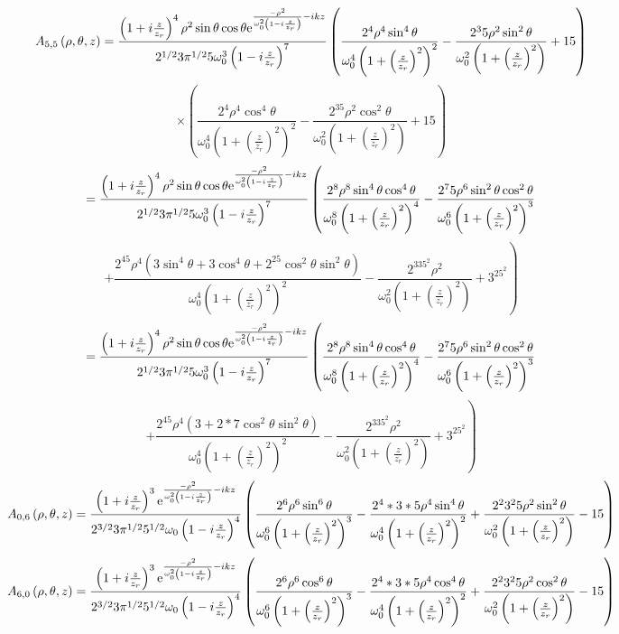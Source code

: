 \documentclass[11pt]{amsart}
\makeatletter
\newcommand{\e}{{\rm e}}				%
\newcommand{\0}{\varnothing}		%
\newcommand{\1}{!}
\newcommand{\2}{@}
\newcommand{\3}{\#}
\newcommand{\4}{\$}
\newcommand{\5}{\%}
\newcommand{\6}{$^\wedge$}
\newcommand{\7}{\&}
\newcommand{\8}{*}
\newcommand{\9}{(}
\makeatother
\begin{document}
\[
A_{5,5} \left(\rho, \theta,z \right) = \frac{\left(1+i\frac{z}{z_r}\right)^4\rho^2\sin \theta \cos \theta\e^{\frac{-\rho^2}{\omega_0^2\left(1-i\frac{z}{z_r}\right)}-ikz}}{2^{1/2}3\pi^{1/2}5\omega_0^3\left(1-i\frac{z}{z_r}\right)^7}\left(\frac{2^4\rho^4\sin^4 \theta}{\omega_0^4\left(1+\left(\frac{z}{z_r}\right)^2\right)^2}-\frac{2^35\rho^2\sin^2\theta}{\omega_0^2\left(1+\left(\frac{z}{z_r}\right)^2\right)}+15\right)
\]
\[
\times \left(\frac{2^4\rho^4\cos^4 \theta}{\omega_0^4\left(1+\left(\frac{z}{z_r}\right)^2\right)^2}-\frac{2^35\rho^2\cos^2\theta}{\omega_0^2\left(1+\left(\frac{z}{z_r}\right)^2\right)}+15\right)
\]
\[
= \frac{\left(1+i\frac{z}{z_r}\right)^4\rho^2\sin \theta \cos \theta\e^{\frac{-\rho^2}{\omega_0^2\left(1-i\frac{z}{z_r}\right)}-ikz}}{2^{1/2}3\pi^{1/2}5\omega_0^3\left(1-i\frac{z}{z_r}\right)^7}\left(\frac{2^8\rho^8\sin^4\theta \cos^4\theta}{\omega_0^8\left(1+\left(\frac{z}{z_r}\right)^2\right)^4}-\frac{2^75\rho^6\sin^2\theta\cos^2\theta}{\omega_0^6\left(1+\left(\frac{z}{z_r}\right)^2\right)^3}\right.
\]
\[
\left.+\frac{2^45\rho^4\left(3\sin^4\theta+3\cos^4\theta +2^25\cos^2\theta\sin^2\theta\right)}{\omega_0^4\left(1+\left(\frac{z}{z_r}\right)^2\right)^2}-\frac{2^335^2\rho^2}{\omega_0^2\left(1+\left(\frac{z}{z_r}\right)^2\right)} + 3^25^2\right)
\]
\[
= \frac{\left(1+i\frac{z}{z_r}\right)^4\rho^2\sin \theta \cos \theta\e^{\frac{-\rho^2}{\omega_0^2\left(1-i\frac{z}{z_r}\right)}-ikz}}{2^{1/2}3\pi^{1/2}5\omega_0^3\left(1-i\frac{z}{z_r}\right)^7}\left(\frac{2^8\rho^8\sin^4\theta \cos^4\theta}{\omega_0^8\left(1+\left(\frac{z}{z_r}\right)^2\right)^4}-\frac{2^75\rho^6\sin^2\theta\cos^2\theta}{\omega_0^6\left(1+\left(\frac{z}{z_r}\right)^2\right)^3}\right.
\]
\[
\left.+\frac{2^45\rho^4\left(3 +2*7\cos^2\theta\sin^2\theta\right)}{\omega_0^4\left(1+\left(\frac{z}{z_r}\right)^2\right)^2}-\frac{2^335^2\rho^2}{\omega_0^2\left(1+\left(\frac{z}{z_r}\right)^2\right)} + 3^25^2\right)
\]
\[
A_{0,6}\left(\rho,\theta,z\right) = \frac{\left(1+i\frac{z}{z_r}\right)^3\e^{\frac{-\rho^2}{\omega_0^2\left(1-i\frac{z}{z_r}\right)}-ikz}}{2^{3/2}3\pi^{1/2}5^{1/2}\omega_0\left(1-i\frac{z}{z_r}\right)^4}\left(\frac{2^6\rho^6\sin^6\theta}{\omega_0^6\left(1+\left(\frac{z}{z_r}\right)^2\right)^3}-\frac{2^4*3*5\rho^4 \sin^4\theta}{\omega_0^4\left(1+\left(\frac{z}{z_r}\right)^2\right)^2}+\frac{2^23^25\rho^2\sin^2\theta}{\omega_0^2\left(1+\left(\frac{z}{z_r}\right)^2\right)}-15\right)
\]
\[
A_{6,0}\left(\rho,\theta,z\right) = \frac{\left(1+i\frac{z}{z_r}\right)^3\e^{\frac{-\rho^2}{\omega_0^2\left(1-i\frac{z}{z_r}\right)}-ikz}}{2^{3/2}3\pi^{1/2}5^{1/2}\omega_0\left(1-i\frac{z}{z_r}\right)^4}\left(\frac{2^6\rho^6\cos^6\theta}{\omega_0^6\left(1+\left(\frac{z}{z_r}\right)^2\right)^3}-\frac{2^4*3*5\rho^4 \cos^4\theta}{\omega_0^4\left(1+\left(\frac{z}{z_r}\right)^2\right)^2}+\frac{2^23^25\rho^2\cos^2\theta}{\omega_0^2\left(1+\left(\frac{z}{z_r}\right)^2\right)}-15\right)
\]
\end{document}
